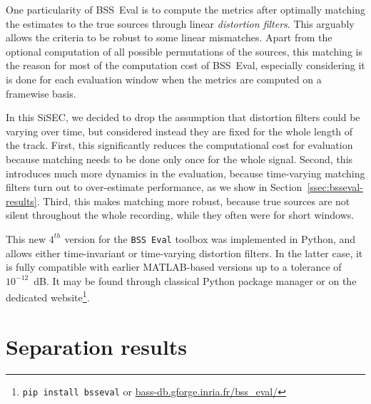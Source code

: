 \documentclass{llncs}
\begin{document}
One particularity of BSS~Eval is to compute the metrics after optimally matching the estimates to the true sources through linear \textit{distortion filters}. This arguably allows the criteria to be robust to some linear mismatches. Apart from the optional computation of all possible permutations of the sources, this matching is the reason for most of the computation cost of BSS~Eval, especially considering it is done for each evaluation window when the metrics are computed on a framewise basis.

In this SiSEC, we decided to drop the assumption that distortion filters could be varying over time, but considered instead they are fixed for the whole length of the track. First, this significantly reduces the computational cost for evaluation because matching needs to be done only once for the whole signal. Second, this introduces much more dynamics in the evaluation, because time-varying matching filters turn out to over-estimate performance, as we show in Section~\ref{ssec:bsseval-results}. Third, this makes matching more robust, because true sources are not silent throughout the whole recording, while they often were for short windows.

This new $4^{th}$ version for the \texttt{BSS~Eval} toolbox was implemented in Python, and allows either time-invariant or time-varying distortion filters. In the latter case, it is fully compatible with earlier MATLAB-based versions up to a tolerance of $10^{-12}$~dB. It may be found through classical Python package manager or on the dedicated website\footnote{\texttt{pip install bsseval} or \url{bass-db.gforge.inria.fr/bss_eval/}}.

\section{Separation results}
\end{document}
